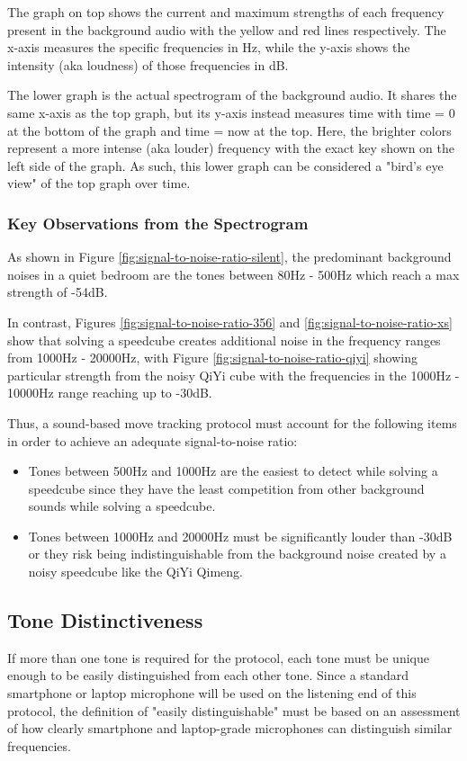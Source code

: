 The graph on top shows the current and maximum strengths of each frequency present in the background audio with the yellow and red lines respectively. 
The x-axis measures the specific frequencies in Hz, while the y-axis shows the intensity (aka loudness) of those frequencies in dB.

The lower graph is the actual spectrogram of the background audio.
It shares the same x-axis as the top graph, but its y-axis instead measures time with time = 0 at the bottom of the graph and time = now at the top.
Here, the brighter colors represent a more intense (aka louder) frequency with the exact key shown on the left side of the graph. As such, this lower graph can be considered a "bird's eye view" of the top graph over time.

\subsubsection{Key Observations from the Spectrogram}
\label{subsubsec:key-observations-from-the-spectrogram}
As shown in Figure \ref{fig:signal-to-noise-ratio-silent}, the predominant background noises in a quiet bedroom are the tones between 80Hz - 500Hz which reach a max strength of -54dB.

In contrast, Figures \ref{fig:signal-to-noise-ratio-356} and \ref{fig:signal-to-noise-ratio-xs} show that solving a speedcube creates additional noise in the frequency ranges from 1000Hz - 20000Hz, with Figure \ref{fig:signal-to-noise-ratio-qiyi} showing particular strength from the noisy QiYi cube with the frequencies in the 1000Hz - 10000Hz range reaching up to -30dB.

Thus, a sound-based move tracking protocol must account for the following items in order to achieve an adequate signal-to-noise ratio:
\begin{itemize}
    \item Tones between 500Hz and 1000Hz are the easiest to detect while solving a speedcube since they have the least competition from other background sounds while solving a speedcube.
    \item Tones between 1000Hz and 20000Hz must be significantly louder than -30dB or they risk being indistinguishable from the background noise created by a noisy speedcube like the QiYi Qimeng.
\end{itemize}

\subsection{Tone Distinctiveness}
\label{subsec:tone-distinctiveness}
If more than one tone is required for the protocol, each tone must be unique enough to be easily distinguished from each other tone.
Since a standard smartphone or laptop microphone will be used on the listening end of this protocol, the definition of "easily distinguishable" must be based on an assessment of how clearly smartphone and laptop-grade microphones can distinguish similar frequencies.

